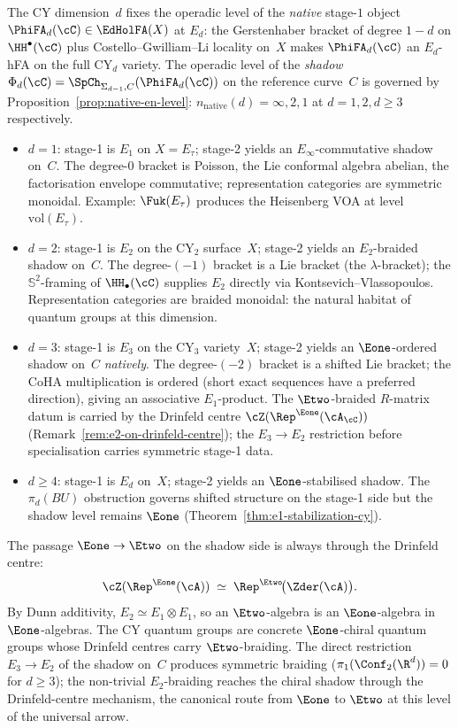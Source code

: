 The CY dimension~$d$ fixes the operadic level of the
\emph{native} stage-$1$ object $\PhiFA_d(\cC) \in \EdHolFA(X)$
at $E_d$: the Gerstenhaber bracket of degree $1 - d$ on
$\HH^\bullet(\cC)$ plus Costello--Gwilliam--Li locality on~$X$
makes $\PhiFA_d(\cC)$ an $E_d$-hFA on the full CY$_d$ variety.
The operadic level of the \emph{shadow}
$\Phi_d(\cC) = \SpCh_{\Sigma_{d-1}, C}(\PhiFA_d(\cC))$ on the
reference curve~$C$ is governed by
Proposition~\ref{prop:native-en-level}:
$n_{\mathrm{native}}(d) = \infty, 2, 1$ at $d = 1, 2, d \geq 3$
respectively.

\begin{itemize}[leftmargin=1.5em,topsep=0.3ex,itemsep=0.4ex]
 \item $d = 1$: stage-1 is $E_1$ on $X = E_\tau$; stage-2 yields
 an $E_\infty$-commutative shadow on~$C$. The degree-$0$
 bracket is Poisson, the Lie conformal algebra abelian, the
 factorisation envelope commutative; representation categories
 are symmetric monoidal. Example: $\Fuk(E_\tau)$ produces the
 Heisenberg VOA at level $\mathrm{vol}(E_\tau)$.
 \item $d = 2$: stage-1 is $E_2$ on the CY$_2$ surface~$X$;
 stage-2 yields an $E_2$-braided shadow on~$C$. The degree-$(-1)$
 bracket is a Lie bracket (the $\lambda$-bracket); the
 $\mathbb{S}^2$-framing of $\HH_\bullet(\cC)$ supplies $E_2$
 directly via Kontsevich--Vlassopoulos. Representation
 categories are braided monoidal: the natural habitat of quantum
 groups at this dimension.
 \item $d = 3$: stage-1 is $E_3$ on the CY$_3$ variety~$X$;
 stage-2 yields an $\Eone$-ordered shadow on~$C$ \emph{natively}.
 The degree-$(-2)$ bracket is a shifted Lie bracket; the CoHA
 multiplication is ordered (short exact sequences have a preferred
 direction), giving an associative $E_1$-product. The
 $\Etwo$-braided $R$-matrix datum is carried by the Drinfeld centre
 $\cZ(\Rep^{\Eone}(\cA_\cC))$
 (Remark~\ref{rem:e2-on-drinfeld-centre}); the $E_3 \to E_2$
 restriction before specialisation carries symmetric stage-1 data.
 \item $d \geq 4$: stage-1 is $E_d$ on~$X$; stage-2 yields an
 $\Eone$-stabilised shadow. The $\pi_d(BU)$ obstruction
 governs shifted structure on the stage-1 side but the shadow
 level remains $\Eone$
 (Theorem~\ref{thm:e1-stabilization-cy}).
\end{itemize}

The passage $\Eone \to \Etwo$ on the shadow side is always
through the Drinfeld centre:
\[
 \cZ(\Rep^{\Eone}(\cA))
 \;\simeq\; \Rep^{\Etwo}\!\bigl(\Zder(\cA)\bigr).
\]
By Dunn additivity, $E_2 \simeq E_1 \otimes E_1$, so an
$\Etwo$-algebra is an $\Eone$-algebra in $\Eone$-algebras. The
CY quantum groups are concrete $\Eone$-chiral
quantum groups whose Drinfeld centres carry
$\Etwo$-braiding. The direct restriction $E_3 \to E_2$ of the
shadow on~$C$ produces symmetric braiding
($\pi_1(\Conf_2(\R^d)) = 0$ for $d \geq 3$); the non-trivial
$E_2$-braiding reaches the chiral shadow through the Drinfeld-centre
mechanism, the canonical route from $\Eone$ to $\Etwo$ at this
level of the universal arrow.

